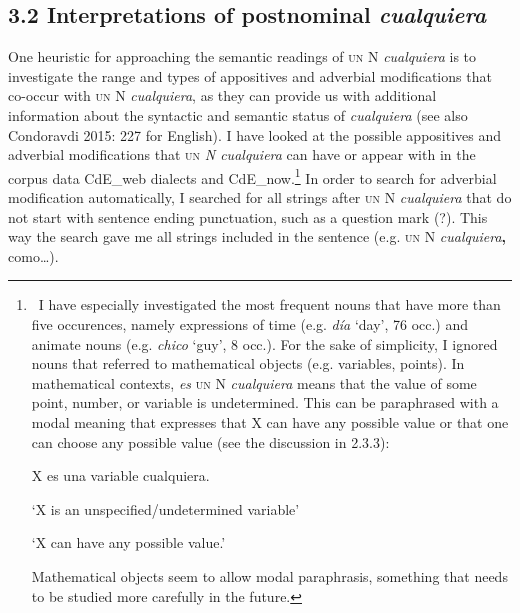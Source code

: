 \subsection[3.2 Interpretations of postnominal cualquiera]{\textbf{3.2 Interpretations of postnominal }\textbf{\textit{cualquiera}}}
\begin{styleStandard}
One heuristic for approaching the semantic readings of \textsc{un} N \textit{cualquiera} is to investigate the range and types of appositives and adverbial modifications that co-occur with \textsc{un} N\textit{ cualquiera}, as they can provide us with additional information about the syntactic and semantic status of \textit{cualquiera} (see also Condoravdi 2015: 227 for English). I have looked at the possible appositives and adverbial modifications that \textsc{un} \textit{N cualquiera} can have or appear with in the corpus data CdE\_web dialects and CdE\_now.\footnote{\textrm{\ I have especially investigated the most frequent nouns that have more than five occurences, namely expressions of time (e.g. }\textrm{\textit{día}}\textrm{ ‘day’, 76 occ.) and animate nouns (e.g. }\textrm{\textit{chico}}\textrm{ ‘guy’, 8 occ.). For the sake of simplicity, I ignored nouns that referred to mathematical objects (e.g. variables, points). In mathematical contexts, }\textrm{\textit{es }}\textsc{un}\textrm{ N}\textrm{\textit{ cualquiera}}\textrm{ means that the value of some point, number, or variable is undetermined. This can be paraphrased with a modal meaning that expresses that X can have any possible value or that one can choose any possible value (see the discussion in 2.3.3):}\par 
\setcounter{listWWNumxixleveli}{0}
\begin{listWWNumxixleveli}
\item 
\begin{styleFootnote}
\textrm{X es una variable cualquiera.}
\end{styleFootnote}
\end{listWWNumxixleveli}
\textrm{‘X is an unspecified/undetermined variable’}\par \textrm{‘X can have any possible value.’}\par \textrm{Mathematical objects seem to allow modal paraphrasis, something that needs to be studied more carefully in the future.}} In order to search for adverbial modification automatically, I searched for all strings after \textsc{un} N \textit{cualquiera }that do not start with sentence ending punctuation, such as a question mark (?). This way the search gave me all strings included in the sentence (e.g. \textsc{un} N \textit{cualquiera}\textbf{,} como…).
\end{styleStandard}

